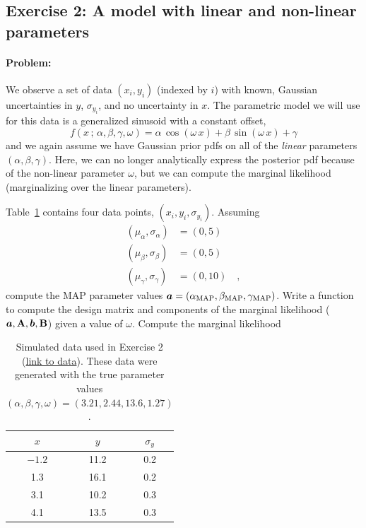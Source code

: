 \subsection{Exercise 2: A model with linear and non-linear parameters}

\paragraph{Problem:} We observe a set of data $(x_i, y_i)$ (indexed by $i$) with
known, Gaussian uncertainties in $y$, $\sigma_{y_i}$, and no uncertainty in $x$.
The parametric model we will use for this data is a generalized sinusoid with a
constant offset,
\begin{equation}
  f(x \,;\, \alpha, \beta, \gamma, \omega) =
    \alpha\,\cos(\omega \, x) + \beta\,\sin(\omega \, x) + \gamma
\end{equation}
and we again assume we have Gaussian prior pdfs on all of the \emph{linear}
parameters $(\alpha, \beta, \gamma)$.
Here, we can no longer analytically express the posterior pdf because of the
non-linear parameter $\omega$, but we can compute the marginal likelihood
(marginalizing over the linear parameters).

Table~\ref{tbl:data2} contains four data points, $(x_i, y_i, \sigma_{y_i})$.
Assuming
\begin{align}
  (\mu_\alpha, \sigma_\alpha) &= (0, 5)\\
  (\mu_\beta, \sigma_\beta) &= (0, 5)\\
  (\mu_\gamma, \sigma_\gamma) &= (0, 10) \quad ,
\end{align}
compute the MAP parameter values $\boldsymbol{a} = (\alpha_{\rm MAP}, \beta_{\rm MAP},
\gamma_{\rm MAP})$.
Write a function to compute the design matrix and components of the marginal
likelihood ($\boldsymbol{a}, \mathbf{A}, \boldsymbol{b}, \mathbf{B}$) given a value of $\omega$.
Compute the marginal likelihood

\begin{table}[t!]
  \footnotesize
  \begin{center}
    \begin{tabular}{c|c|c}
      $x$ & $y$ & $\sigma_y$ \\
      \hline
      $-1.2$ & 11.2 & 0.2 \\
      1.3 & 16.1 & 0.2 \\
      3.1 & 10.2 & 0.3 \\
      4.1 & 13.5 & 0.3
    \end{tabular}
    \caption{Simulated data used in Exercise 2
    (\href{https://raw.githubusercontent.com/davidwhogg/GaussianProductRefactor/master/notebooks/data2.csv}{link to data}). These data were generated with the true parameter values $(\alpha, \beta, \gamma, \omega) = (3.21, 2.44, 13.6, 1.27)$.
    \label{tbl:data2}}
  \end{center}
\end{table}

